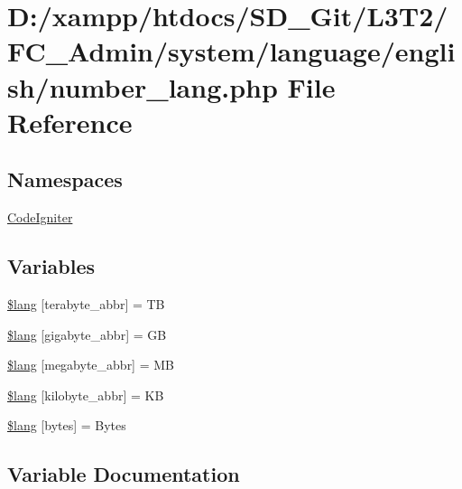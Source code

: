 \hypertarget{number__lang_8php}{}\section{D\+:/xampp/htdocs/\+S\+D\+\_\+\+Git/\+L3\+T2/\+F\+C\+\_\+\+Admin/system/language/english/number\+\_\+lang.php File Reference}
\label{number__lang_8php}
\subsection*{Namespaces}
\begin{DoxyCompactItemize}
\item 
 \hyperlink{namespace_code_igniter}{Code\+Igniter}
\end{DoxyCompactItemize}
\subsection*{Variables}
\begin{DoxyCompactItemize}
\item 
\hyperlink{number__lang_8php_a72963402ca792afbae1ba34a4050fcde}{\$lang} \mbox{[}\textquotesingle{}terabyte\+\_\+abbr\textquotesingle{}\mbox{]} = \textquotesingle{}T\+B\textquotesingle{}
\item 
\hyperlink{number__lang_8php_a2349e7364cbc6402c44bd135b132d9d6}{\$lang} \mbox{[}\textquotesingle{}gigabyte\+\_\+abbr\textquotesingle{}\mbox{]} = \textquotesingle{}G\+B\textquotesingle{}
\item 
\hyperlink{number__lang_8php_ae1fdf8fb2977ddec5fd9f2237f277edc}{\$lang} \mbox{[}\textquotesingle{}megabyte\+\_\+abbr\textquotesingle{}\mbox{]} = \textquotesingle{}M\+B\textquotesingle{}
\item 
\hyperlink{number__lang_8php_a78200289bbf44dce8b0d5f06072379e6}{\$lang} \mbox{[}\textquotesingle{}kilobyte\+\_\+abbr\textquotesingle{}\mbox{]} = \textquotesingle{}K\+B\textquotesingle{}
\item 
\hyperlink{number__lang_8php_aeec8ade1229052ff8627a350480bba9c}{\$lang} \mbox{[}\textquotesingle{}bytes\textquotesingle{}\mbox{]} = \textquotesingle{}Bytes\textquotesingle{}
\end{DoxyCompactItemize}


\subsection{Variable Documentation}
\hypertarget{number__lang_8php_a72963402ca792afbae1ba34a4050fcde}{}
